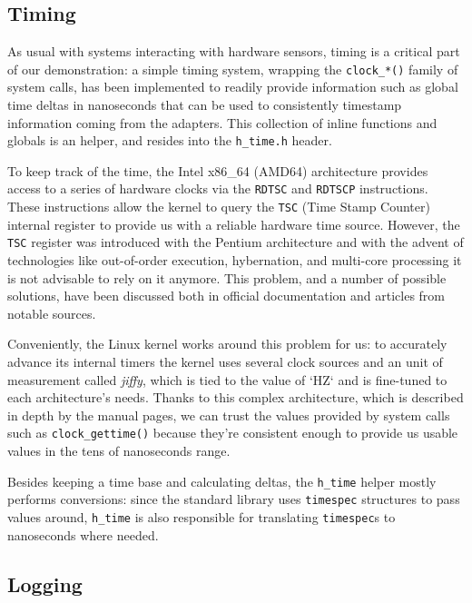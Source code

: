 \documentclass[a4paper,12pt]{report}
\begin{document}
\subsection{Timing}

As usual with systems interacting with hardware sensors, timing is a critical part of our demonstration: a simple timing system, wrapping the \texttt{clock\_*()} family of system calls, has been implemented to readily provide information such as global time deltas in nanoseconds that can be used to consistently timestamp information coming from the adapters. This collection of inline functions and globals is an helper, and resides into the \texttt{h\_time.h} header. 

To keep track of the time, the Intel x86\_64 (AMD64) architecture provides access to a series of hardware clocks via the \texttt{RDTSC} and \texttt{RDTSCP} instructions. These instructions allow the kernel to query the \texttt{TSC} (Time Stamp Counter) internal register to provide us with a reliable hardware time source. However, the \texttt{TSC} register was introduced with the Pentium architecture and with the advent of technologies like out-of-order execution, hybernation, and multi-core processing it is not advisable to rely on it anymore. This problem, and a number of possible solutions, have been discussed both in official documentation\cite{intel-rdtsc-bench} and articles from notable sources\cite{ms-rdtsc-issues}.

Conveniently, the Linux kernel works around this problem for us: to accurately advance its internal timers the kernel uses several clock sources and an unit of measurement called \textit{jiffy}, which is tied to the value of `HZ` and is fine-tuned to each architecture's needs\cite{elinux-hrts}. Thanks to this complex architecture, which is described in depth by the manual pages\cite{man-clock-getres-2}, we can trust the values provided by system calls such as \texttt{clock\_gettime()} because they're consistent enough to provide us usable values in the tens of nanoseconds range.

Besides keeping a time base and calculating deltas, the \texttt{h\_time} helper mostly performs conversions: since the standard library uses \texttt{timespec} structures to pass values around, \texttt{h\_time} is also responsible for translating \texttt{timespec}s to nanoseconds where needed.  

\subsection{Logging}
\end{document}

